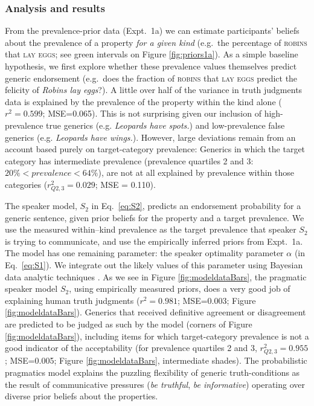 \documentclass[11pt,letterpaper]{article}
\begin{document}
\subsubsection*{Analysis and results}
 
From the prevalence-prior data (Expt.~1a) we can estimate participants' beliefs about the prevalence of a property \emph{for a given kind} (e.g.~the percentage of \textsc{robins} that \textsc{lay eggs}; see green intervals on Figure \ref{fig:priors1a}).
As a simple baseline hypothesis, we first explore whether these prevalence values themselves predict generic endorsement (e.g.~does the fraction of \textsc{robins} that \textsc{lay eggs} predict the felicity of \emph{Robins lay eggs}?).
A little over half of the variance in truth judgments data is explained by the prevalence of the property within the kind alone ($r^2 = 0.599$; MSE=0.065). 
This is not surprising given our inclusion of high-prevalence true generics (e.g. \emph{Leopards have spots.}) and low-prevalence false generics (e.g. \emph{Leopards have wings.}). 
However, large deviations remain from an account based purely on target-category prevalence: Generics in which the target category has intermediate prevalence (prevalence quartiles 2 and 3: $ 20\% < prevalence < 64\%$), are not at all explained by prevalence within those categories ($r_{Q2,3}^2 = 0.029$; MSE = 0.110).

The speaker model, $S_2$ in Eq.~\ref{eq:S2}, predicts an endorsement probability for a generic sentence, given prior beliefs for the property and a target prevalence. 
We use the measured within--kind prevalence as the target prevalence that speaker $S_2$ is trying to communicate, and use the
empirically inferred priors from Expt.~1a. The model has one remaining parameter: the speaker optimality parameter $\alpha$ (in Eq.~\ref{eq:S1}).
We integrate out the likely values of this parameter using Bayesian data analytic techniques \cite{LW2014}.
As we see in Figure \ref{fig:modeldataBars}, the pragmatic speaker model $S_2$, using empirically measured priors, does a very good job of explaining human truth judgments ($r^2=0.981$; MSE=0.003; Figure \ref{fig:modeldataBars}). 
Generics that received definitive agreement or disagreement are predicted to be judged as such by the model (corners of Figure \ref{fig:modeldataBars}), including items for which target-category prevalence is not a good indicator of the acceptability (for prevalence quartiles 2 and 3, $r_{Q2,3}^2=0.955$; MSE=0.005; Figure \ref{fig:modeldataBars}, intermediate shades).
The probabilistic pragmatics model explains the puzzling flexibility of generic truth-conditions as the result of communicative pressures (\emph{be truthful}, \emph{be informative}) operating over diverse prior beliefs about the properties. 
\end{document}
